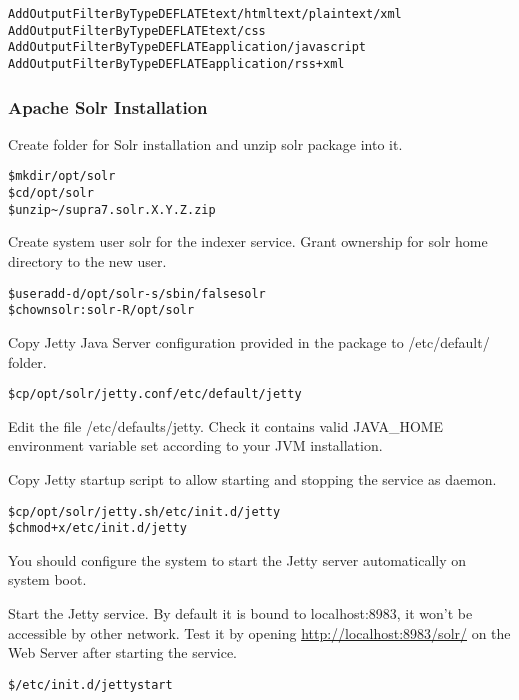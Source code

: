 \documentclass[12pt]{article}
\newcommand{\vigPackageName}{supra7}
\newcommand{\vigReleasePath}{\textasciitilde/}
\newcommand{\vigReleaseVersion}{X.Y.Z}
\begin{document}
\begin{alltt}
AddOutputFilterByType DEFLATE text/html text/plain text/xml
AddOutputFilterByType DEFLATE text/css
AddOutputFilterByType DEFLATE application/javascript
AddOutputFilterByType DEFLATE application/rss+xml
\end{alltt}

\subsubsection{Apache Solr Installation\label{solrInstallation}}

Create folder for Solr installation and unzip solr package into it.

\begin{alltt}
\$ mkdir /opt/solr
\$ cd /opt/solr
\$ unzip {\vigReleasePath}{\vigPackageName}.solr.\vigReleaseVersion.zip
\end{alltt}

Create system user \textsf{solr} for the indexer service. Grant ownership for solr home directory to the new user.

\begin{alltt}
\$ useradd -d /opt/solr -s /sbin/false solr
\$ chown solr:solr -R /opt/solr
\end{alltt}

Copy Jetty Java Server configuration provided in the package to \textsf{/etc/default/} folder.

\begin{alltt}
\$ cp /opt/solr/jetty.conf /etc/default/jetty
\end{alltt}

Edit the file \textsf{/etc/defaults/jetty}. Check it contains valid JAVA\_HOME environment variable set according to your JVM installation.

Copy Jetty startup script to allow starting and stopping the service as daemon.

\begin{alltt}
\$ cp /opt/solr/jetty.sh /etc/init.d/jetty
\$ chmod +x /etc/init.d/jetty
\end{alltt}

You should configure the system to start the Jetty server automatically on system boot.

Start the Jetty service. By default it is bound to localhost:8983, it won't be accessible by other network. Test it by opening \url{http://localhost:8983/solr/} on the Web Server after starting the service.

\begin{alltt}
\$ /etc/init.d/jetty start
\end{alltt}
\end{document}
